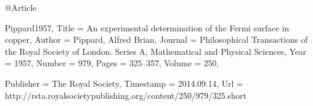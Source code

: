 @Article{Pippard1957,
  Title                    = {An experimental determination of the Fermi surface in copper},
  Author                   = {Pippard, Alfred Brian},
  Journal                  = {Philosophical Transactions of the Royal Society of London. Series A, Mathematical and Physical Sciences},
  Year                     = {1957},
  Number                   = {979},
  Pages                    = {325--357},
  Volume                   = {250},

  Publisher                = {The Royal Society},
  Timestamp                = {2014.09.14},
  Url                      = {http://rsta.royalsocietypublishing.org/content/250/979/325.short}
}